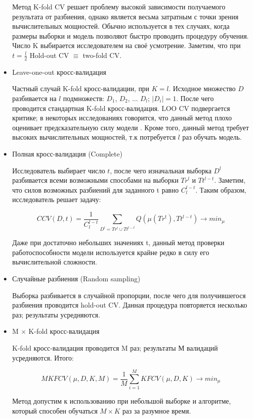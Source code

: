 \documentclass[a4paper, 14pt]{article}
\begin{document}
\begin{itemize}
	Метод K-fold CV решает проблему высокой зависимости получаемого результата от разбиения, однако является весьма затратным с точки зрения вычислительных мощностей. Обычно используется в тех случаях, когда размеры выборки и модель позволяют быстро проводить процедуру обучения. Число K выбирается исследователем на своё усмотрение. Заметим, что при $t = \frac{l}{2}$ Hold-out CV $ \equiv $ two-fold CV.
	
	\item Leave-one-out кросс-валидация
	
	Частный случай K-fold кросс-валидации, при $K=l$. Исходное множество $D$ разбивается на $l$ подмножеств: $D_1$, $D_2$, $\dots$ $D_l$; $\left|D_i\right| = 1$. После чего проводится стандартная K-fold кросс-валидация. LOO CV подвергается критике; в некоторых исследованиях говорится, что данный метод плохо оценивает предсказательную силу модели \cite{efron1986biased}. Кроме того, данный метод требует высоких вычислительных мощностей, т.к потребуется $l$ раз обучать модель.
	
	\item Полная кросс-валидация (Complete)
	
	Исследователь выбирает число $t$, после чего изначальная выборка $D^l$ разбивается всеми возможными способами на выборки $Tr^l$ и $Tt^{l-t}$. Заметим, что силов возможных разбиений для заданного t равно $C_l^{l-t}$. Таким образом, исследователь решает задачу:
	
	\[CCV(D, t) = \frac{1}{C_l^{l-t}} \sum_{D^l = Tr^l \cup Tt^{l-t}} Q(\mu (Tr^t), Tt^{l-t}) \rightarrow min_{\mu} \]
	
	Даже при достаточно небольших значениях t, данный метод проверки работоспособности модели используется крайне редко в силу его вычислительной сложности.
	
	\item Случайные разбиения (Random sampling)
	
	Выборка разбивается в случайной пропорции, после чего для получившегося разбиения проводится hold-out CV. Данная процедура повторяется несколько раз; результаты усредняются. 
	
	
	\item M $\times$ K-fold кросс-валидация
	
	K-fold кросс-валидация проводится M раз; результаты М валидаций усредняются. Итого: 
	
	\[MKFCV(\mu, D, K, M) = \frac{1}{M} \sum_{i=1}^{M} KFCV(\mu, D, K) \rightarrow min_{\mu}  \]
	
	Метод допустим к использованию при небольшой выборке и алгоритме, который способен обучаться $M \times K$ раз за разумное время.
\end{itemize}
\label{fkdsfsdfdsa}
\end{document}
